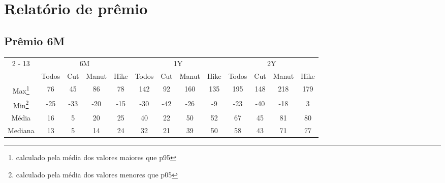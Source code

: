 \documentclass{article}%
\begin{document}
%
\normalsize%
\setcounter{section}{3}%
\setcounter{page}{10}%
\section{Relatório de prêmio}%
\label{sec:Relatriodeprmio}%
\subsection{Prêmio 6M}%
\label{subsec:Prmio6M}%
\begin{minipage}{\textwidth}%
\centering%
\hspace*{-0.3in}%
%
%
\begin{tabular}{c c c c c c c c c c c c c }%
\cline{2%
-%
13}%
&\multicolumn{4}{|c|}{6M}&\multicolumn{4}{c|}{1Y}&\multicolumn{4}{c|}{2Y}\\%
&\multicolumn{1}{|c}{Todos}&\multicolumn{1}{c}{Cut}&\multicolumn{1}{c}{Manut}&\multicolumn{1}{c|}{Hike}&\multicolumn{1}{c}{Todos}&\multicolumn{1}{c}{Cut}&\multicolumn{1}{c}{Manut}&\multicolumn{1}{c|}{Hike}&\multicolumn{1}{c}{Todos}&\multicolumn{1}{c}{Cut}&\multicolumn{1}{c}{Manut}&\multicolumn{1}{c|}{Hike}\\%
\hline%
\multicolumn{1}{|c|}{Max\footnote{calculado pela média dos valores maiores que p95}}&\multicolumn{1}{c}{76}&\multicolumn{1}{c}{45}&\multicolumn{1}{c}{86}&\multicolumn{1}{c|}{78}&\multicolumn{1}{c}{142}&\multicolumn{1}{c}{92}&\multicolumn{1}{c}{160}&\multicolumn{1}{c|}{135}&\multicolumn{1}{c}{195}&\multicolumn{1}{c}{148}&\multicolumn{1}{c}{218}&\multicolumn{1}{c|}{179}\\%
\hline%
\multicolumn{1}{|c|}{Min\footnote{calculado pela média dos valores menores que p05}}&\multicolumn{1}{c}{{-}25}&\multicolumn{1}{c}{{-}33}&\multicolumn{1}{c}{{-}20}&\multicolumn{1}{c|}{{-}15}&\multicolumn{1}{c}{{-}30}&\multicolumn{1}{c}{{-}42}&\multicolumn{1}{c}{{-}26}&\multicolumn{1}{c|}{{-}9}&\multicolumn{1}{c}{{-}23}&\multicolumn{1}{c}{{-}40}&\multicolumn{1}{c}{{-}18}&\multicolumn{1}{c|}{3}\\%
\hline%
\multicolumn{1}{|c|}{Média}&\multicolumn{1}{c}{16}&\multicolumn{1}{c}{5}&\multicolumn{1}{c}{20}&\multicolumn{1}{c|}{25}&\multicolumn{1}{c}{40}&\multicolumn{1}{c}{22}&\multicolumn{1}{c}{50}&\multicolumn{1}{c|}{52}&\multicolumn{1}{c}{67}&\multicolumn{1}{c}{45}&\multicolumn{1}{c}{81}&\multicolumn{1}{c|}{80}\\%
\hline%
\multicolumn{1}{|c|}{Mediana}&\multicolumn{1}{c}{13}&\multicolumn{1}{c}{5}&\multicolumn{1}{c}{14}&\multicolumn{1}{c|}{24}&\multicolumn{1}{c}{32}&\multicolumn{1}{c}{21}&\multicolumn{1}{c}{39}&\multicolumn{1}{c|}{50}&\multicolumn{1}{c}{58}&\multicolumn{1}{c}{43}&\multicolumn{1}{c}{71}&\multicolumn{1}{c|}{77}\\%

\end{tabular}
\end{minipage}
\end{document}
